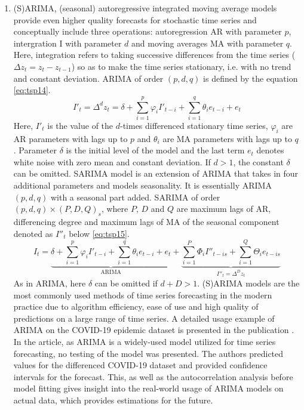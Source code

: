 \documentclass[3p,times,procedia]{elsarticle}
\begin{document}
\begin{enumerate}
\item (S)ARIMA, (seasonal) autoregressive integrated moving average models provide even higher quality forecasts for stochastic time series and conceptually include three operations: autoregression AR with parameter $p$, intergration I with parameter $d$ and moving averages MA with parameter $q$. Here, integration refers to taking successive differences from the time series ($\Delta z_t = z_t - z_{t-1}$) so as to make the time series stationary, i.e. with no trend and constant deviation. ARIMA of order $(p,d,q)$ is defined by the equation \ref{eq:tsp14}.
\begin{equation} \label{eq:tsp14}
I'_t = \Delta^d z_t = \delta + \sum_{i=1}^p \varphi_i I'_{t-i} + \sum_{i=1}^q \theta_i e_{t-i} + e_t
\end{equation}
Here, $I'_t$ is the value of the $d$-times differenced stationary time series, $\varphi_i$ are AR parameters with lags up to $p$ and $\theta_i$ are MA parameters with lags up to $q$. Parameter $\delta$ is the initial level of the model and the last term $e_t$ denotes white noise with zero mean and constant deviation. If $d>1$, the constant $\delta$ can be omitted.
SARIMA model is an extension of ARIMA that takes in four additional parameters and models seasonality. It is essentially ARIMA $(p,d,q)$ with a seasonal part added. SARIMA of order $(p,d,q)\times (P,D,Q)_s$, where $P$, $D$ and $Q$ are maximum lags of AR, differencing degree and maximum lags of MA of the seasonal component denoted as $I''_t$ below \ref{eq:tsp15}.
\begin{equation} \label{eq:tsp15}
I_t = \underbrace{\delta + \sum_{i=1}^p \varphi_i I'_{t-i} + \sum_{i=1}^q \theta_i e_{t-i} + e_t}_{\mathrm{ARIMA}} + \underbrace{\sum_{i=1}^P \Phi_i I''_{t-is} + \sum_{i=1}^Q \Theta_i e_{t-is}}_{I''_t = \Delta^D z_t}
\end{equation}
As in ARIMA, here $\delta$ can be omitted if $d+D > 1$. (S)ARIMA models are the most commonly used methods of time series forecasting in the modern practice due to algorithm efficiency, ease of use and high quality of predictions on a large range of time series.
A detailed usage example of ARIMA on the COVID-19 epidemic dataset is presented in the publication \cite{benvenuto2020application}. In the article, as ARIMA is a widely-used model utilized for time series forecasting, no testing of the model was presented. The authors predicted values for the differenced COVID-19 dataset and provided confidence intervals for the forecast. This, as well as the autocorrelation analysis before model fitting gives insight into the real-world usage of ARIMA models on actual data, which provides estimations for the future. 
\end{enumerate}
\end{document}
